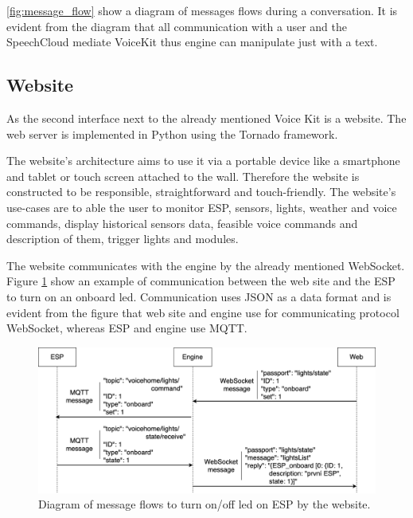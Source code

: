 \cref{fig:message_flow} show a diagram of messages flows during a conversation. It is evident from the diagram that all communication with a user and the SpeechCloud mediate VoiceKit thus engine can manipulate just with a text.

\subsection{Website}

As the second interface next to the already mentioned Voice Kit is a website. The web server is implemented in Python using the Tornado framework.

The website's architecture aims to use it via a portable device like a smartphone and tablet or touch screen attached to the wall. Therefore the website is constructed to be responsible, straightforward and touch-friendly. The website's use-cases are to able the user to monitor ESP, sensors, lights, weather and voice commands, display historical sensors data, feasible voice commands and description of them, trigger lights and modules.

The website communicates with the engine by the already mentioned WebSocket. Figure \ref{fig:lights_onoff_messages} show an example of communication between the web site and the ESP to turn on an onboard led. Communication uses JSON as a data format and is evident from the figure that web site and engine use for communicating protocol WebSocket, whereas ESP and engine use MQTT.

\begin{figure}[H]
	\centering
	\includegraphics[width=\textwidth]{img/lights_onoff_messages.png}
	\caption{Diagram of message flows to turn on/off led on ESP by the website.}
	\label{fig:lights_onoff_messages}
\end{figure}
